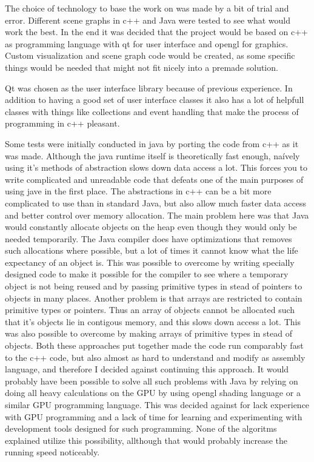\documentclass[a4paper,12pt]{report}
\begin{document}
The choice of technology to base the work on was made by a bit of trial and error. Different scene graphs in c++ and Java were tested to see what would work the best. In the end it was decided that the project would be based on c++ as programming language with qt for user interface and opengl for graphics. Custom visualization and scene graph code would be created, as some specific things would be needed that might not fit nicely into a premade solution. 

Qt was chosen as the user interface library because of previous experience. In addition to having a good set of user interface classes it also has a lot of helpfull classes with things like collections and event handling that make the process of programming in c++ pleasant.

Some tests were initially conducted in java by porting the code from c++ as it was made. Although the java runtime itself is theoretically fast enough, naívely using it's methods of abstraction slows down data access a lot. This forces you to write complicated and unreadable code that defeats one of the main purposes of using jave in the first place. The abstractions in c++ can be a bit more complicated to use than in standard Java, but also allow much faster data access and better control over memory allocation. The main problem here was that Java would constantly allocate objects on the heap even though they would only be needed temporarily. The Java compiler does have optimizations that removes such allocations where possible, but a lot of times it cannot know what the life expectancy of an object is. This was possible to overcome by writing specially designed code to make it possible for the compiler to see where a temporary object is not being reused and by passing primitive types in stead of pointers 
to objects in many places. Another problem is that arrays are restricted to contain primitive types or pointers. Thus an array of objects cannot be allocated such that it's objects lie in contigous memory, and this slows down access a lot. This was also possible to overcome by making arrays of primitive types in stead of objects. Both these approaches put together made the code run comparably fast to the c++ code, but also almost as hard to understand and modify as assembly language, and therefore I decided against continuing this approach. It would probably have been possible to solve all such problems with Java by relying on doing all heavy calculations on the GPU by using opengl shading language or a similar GPU programming language. This was decided against for lack experience with GPU programming and a lack of time for learning and experimenting with development tools designed for such programming. None of the algoritms explained utilize this possibility, allthough that would probably increase the 
running speed noticeably.
\end{document}

